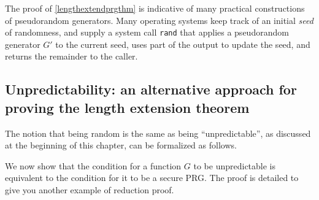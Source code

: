 The proof of \cref{lengthextendprgthm} is indicative of many practical
constructions of pseudorandom generators. Many operating systems keep
track of an initial \emph{seed} of randomness, and supply a system call
\texttt{rand} that applies a pseudorandom generator \(G'\) to the
current seed, uses part of the output to update the seed, and returns
the remainder to the caller.

\subsection{Unpredictability: an alternative approach for proving the
length extension theorem}\label{Unpredictability-an-alternativ}

The notion that being random is the same as being ``unpredictable'', as
discussed at the beginning of this chapter, can be formalized as
follows.

\hypertarget{unpreddef}{}

We now show that the condition for a function \(G\) to be unpredictable
is equivalent to the condition for it to be a secure PRG. The proof is
detailed to give you another example of reduction proof.

\hypertarget{unpredequiv}{}

